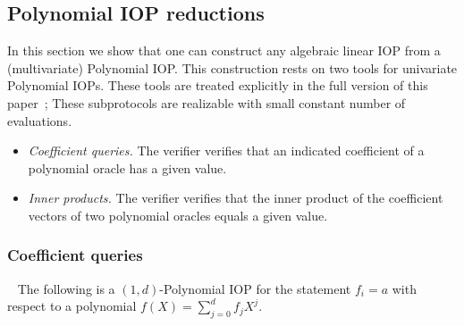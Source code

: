 \subsection{Polynomial IOP reductions} \label{sec:polynomialIOPreductions}

In this section we show that one can construct any algebraic linear IOP from a (multivariate) Polynomial IOP. This construction rests on two tools for univariate Polynomial IOPs. These tools are treated explicitly in the full version of this paper~\cite{DARK/Supersonic:fullversion}; These subprotocols are realizable with small constant number of evaluations.
\begin{itemize}
    \item \emph{Coefficient queries.} The verifier verifies that an indicated coefficient of a polynomial oracle has a given value.
    \item \emph{Inner products.} The verifier verifies that the inner product of the coefficient vectors of two polynomial oracles equals a given value.
\end{itemize}

\subsubsection{Coefficient queries}~\label{sec:opencoefficient} 
The following is a $(1, d)$-Polynomial IOP for the statement $f_i = a$ with respect to a polynomial $f(X) = \sum_{j=0}^d f_j X^j$. %

